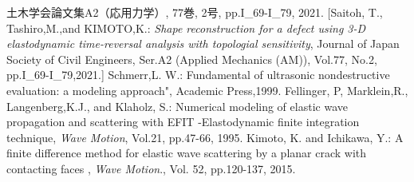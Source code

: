 ﻿\documentclass{jjsce}
\begin{document}
\begin{thebibliography}{9}
	土木学会論文集A2（応用力学）, 77巻, 2号, pp.I\_69-I\_79, 2021.
	[Saitoh, T., Tashiro,M.,and KIMOTO,K.:
	\textit{Shape reconstruction for a defect using 3-D elastodynamic time-reversal analysis with topologial sensitivity}, 
	Journal of Japan Society of Civil Engineers, Ser.A2 (Applied Mechanics (AM)), 
	Vol.77, No.2, pp.I\_69-I\_79,2021.] 
	Schmerr,L. W.:
	Fundamental of ultrasonic nondestructive evaluation: a modeling approach", Academic Press,1999.	
	Fellinger, P, Marklein,R., Langenberg,K.J., and Klaholz, S.: 
	Numerical modeling of elastic wave propagation and scattering with EFIT 
	-Elastodynamic finite integration technique, 
	\textit{ Wave Motion}, Vol.21, pp.47-66, 1995.
	Kimoto, K. and Ichikawa, Y.:
	A finite difference method for elastic wave scattering by a planar crack with contacting faces
	, \textit{Wave Motion}., Vol. 52, pp.120-137, 2015.
\end{thebibliography}
\end{document}
